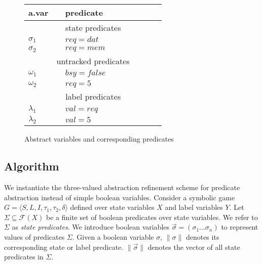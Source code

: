 \documentclass[a4paper,twoside,openright,11pt]{book}
\newcommand{\forms}[0]{\mathcal{F}}
\newcommand{\vect}[1]{\vec{#1}}
\theoremstyle{definition}
\begin{document}
\begin{figure}
    \caption{Abstract variables and corresponding predicates}
    \begin{tabular}{|p{0.14\linewidth}|p{0.5\linewidth}|}
        \hline
        {\bf a.var} & {\bf predicate} \\
        \hline\hline
        \multicolumn{2}{|c|}{state predicates} \\
        \hline
        $\sigma_1$ & $req=dat$   \\
        $\sigma_2$ & $req=mem$   \\
        \hline\hline
        \multicolumn{2}{|c|}{untracked predicates} \\
        \hline
        $\omega_1$ & $bsy=false$ \\
        $\omega_2$ & $req=5$     \\
        \hline\hline
        \multicolumn{2}{|c|}{label predicates} \\
        \hline
        $\lambda_1$ & $val=req$  \\
        $\lambda_2$ & $val=5$    \\
        \hline
    \end{tabular}
\end{figure}

\subsection{Algorithm}

We instantiate the three-valued abstraction refinement scheme for predicate abstraction instead of simple boolean variables. Consider a symbolic game $G = \langle S, L, I, \tau_1, \tau_2, \delta \rangle$ defined over state variables $X$ and label variables $Y$. Let $\Sigma\subseteq\forms(X)$ be a finite set of boolean predicates over state variables. We refer to $\Sigma$ as \emph{state predicates}. We introduce boolean variables $\vect{\sigma}=(\sigma_1\ldots\sigma_n)$ to represent values of predicates $\Sigma$. Given a boolean variable $\sigma$, $\|\sigma\|$ denotes its corresponding state or label predicate. $\|\vect{\sigma}\|$ denotes the vector of all state predicates in $\Sigma$.

\end{document}
